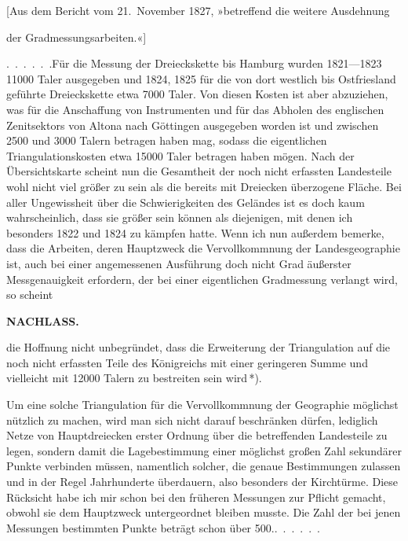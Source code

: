 \bigskip
\begin{center}
[Aus dem Bericht vom 21.~November 1827, »betreffend die weitere Ausdehnung\par
der Gradmessungsarbeiten.«]
\end{center}

\par\noindent\hspace*{\parindent}\mbox{.\ .\ .\ .\ .\ .}\quad Für die Messung der Dreieckskette bis Hamburg wurden
1821---1823 11000 Taler ausgegeben und 1824, 1825 für die von dort westlich bis
Ostfriesland geführte Dreieckskette etwa 7000 Taler. Von diesen Kosten ist
aber abzuziehen, was für die Anschaffung von Instrumenten und für das Abholen
des englischen Zenitsektors von Altona nach Göttingen ausgegeben worden ist
und zwischen 2500 und 3000 Talern betragen haben mag, sodass die eigentlichen
Triangulationskosten etwa 15000 Taler betragen haben mögen. Nach der
Übersichtskarte scheint nun die Gesamtheit der noch nicht erfassten Landesteile
wohl nicht viel größer zu sein als die bereits mit Dreiecken überzogene Fläche.
Bei aller Ungewissheit über die Schwierigkeiten des Geländes ist es doch kaum
wahrscheinlich, dass sie größer sein können als diejenigen, mit denen ich
besonders 1822 und 1824 zu kämpfen hatte. Wenn ich nun außerdem bemerke, dass
die Arbeiten, deren Hauptzweck die Vervollkommnung der Landesgeographie ist,
auch bei einer angemessenen Ausführung doch nicht  Grad
äußerster Messgenauigkeit erfordern, der bei einer eigentlichen Gradmessung
verlangt wird, so scheint
\par\clearpage
\noindent{}\hfill{\small\textbf{NACHLASS.}}\hfill\null\par\medskip
\noindent die Hoffnung nicht unbegründet, dass die Erweiterung der Triangulation
auf die noch nicht erfassten Teile des Königreichs mit einer geringeren
Summe und vielleicht mit 12000 Talern zu bestreiten sein wird\,*).

Um eine solche Triangulation für die Vervollkommnung der Geographie möglichst
nützlich zu machen, wird man sich nicht darauf beschränken dürfen, lediglich
Netze von Hauptdreiecken erster Ordnung über die betreffenden Landesteile
zu legen, sondern damit die Lagebestimmung einer möglichst großen Zahl
sekundärer Punkte verbinden müssen, namentlich solcher, die genaue
Bestimmungen zulassen und in der Regel Jahrhunderte überdauern, also
besonders der Kirchtürme. Diese Rücksicht habe ich mir schon bei den früheren
Messungen zur Pflicht gemacht, obwohl sie dem Hauptzweck untergeordnet
bleiben musste. Die Zahl der bei jenen Messungen bestimmten Punkte beträgt
schon über 500.\quad\mbox{.\ .\ .\ .\ .\ .}

